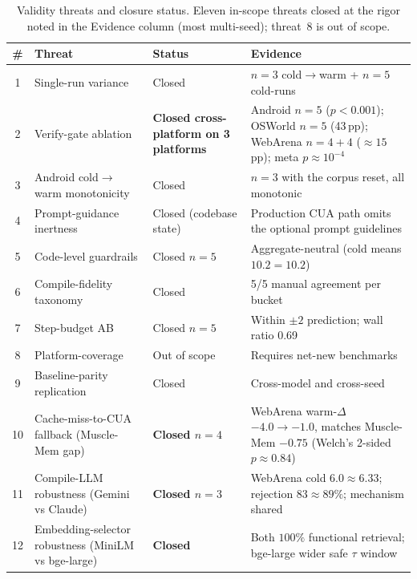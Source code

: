 \documentclass[11pt]{article}
\begin{document}
\begin{table}[h]
\centering
\caption{Validity threats and closure status. Eleven in-scope threats closed at the rigor noted in the Evidence column (most multi-seed); threat~8 is out of scope.}
\label{tab:gap-closure}
\footnotesize
\setlength{\tabcolsep}{4pt}
\begin{tabular}{@{}cp{4.7cm}p{2.7cm}p{6.0cm}@{}}
\toprule
\# & Threat & Status & Evidence \\
\midrule
1 & Single-run variance & Closed & $n{=}3$ cold$\to$warm + $n{=}5$ cold-runs \\
2 & Verify-gate ablation & \textbf{Closed cross-platform on 3 platforms} & Android $n{=}5$ ($p<0.001$); OSWorld $n{=}5$ (43\,pp); WebArena $n{=}4{+}4$ ($\approx 15$\,pp); meta $p\approx 10^{-4}$ \\
3 & Android cold$\to$warm monotonicity & Closed & $n{=}3$ with the corpus reset, all monotonic \\
4 & Prompt-guidance inertness & Closed (codebase state) & Production CUA path omits the optional prompt guidelines \\
5 & Code-level guardrails & Closed $n{=}5$ & Aggregate-neutral (cold means $10.2=10.2$) \\
6 & Compile-fidelity taxonomy & Closed & 5/5 manual agreement per bucket \\
7 & Step-budget AB & Closed $n{=}5$ & Within $\pm 2$ prediction; wall ratio 0.69 \\
8 & Platform-coverage & Out of scope & Requires net-new benchmarks \\
9 & Baseline-parity replication & Closed & Cross-model and cross-seed \\
10 & Cache-miss-to-CUA fallback (Muscle-Mem gap) & \textbf{Closed $n{=}4$} & WebArena warm-$\Delta$ $-4.0 \to -1.0$, matches Muscle-Mem $-0.75$ (Welch's 2-sided $p \approx 0.84$) \\
11 & Compile-LLM robustness (Gemini vs Claude) & \textbf{Closed $n{=}3$} & WebArena cold $6.0 \approx 6.33$; rejection $83 \approx 89\%$; mechanism shared \\
12 & Embedding-selector robustness (MiniLM vs bge-large) & \textbf{Closed} & Both $100\%$ functional retrieval; bge-large wider safe $\tau$ window \\
\bottomrule
\end{tabular}
\end{table}
\end{document}
